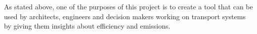 
As stated above, %
one of the purposes of this project is to create a tool that can be used by architects, engineers and decision makers working on transport systems by giving them insights about efficiency and emissions.